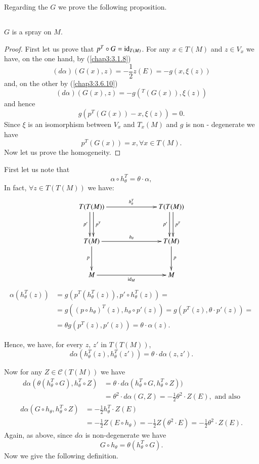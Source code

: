 Regarding the $G$ we prove the following proposition.

\setcounter{subsection}{1}

\subsection{}\label{chap4:4.2.2}

\begin{prop*}
$G$ is a spray on $M$.
\end{prop*}

\begin{proof}
First let us prove that $p^{T}\circ G=\operatorname{id}_{T(M)}$. For any $x\in T(M)$
and $z\in V_{x}$ we have, on the one hand, by (\ref{chap3:3.1.8})
$$
(d\alpha)(G(x),z)=-\frac{1}{2}z(E)=-g(x,\xi(z))
$$\pageoriginale
and, on the other by (\ref{chap3:3.6.10})
$$
(d\alpha)(G(x),z)=-g({}^{T}(G(x)),\xi(z))
$$
and hence
$$
g(p^{T}(G(x))-x,\xi(z))=0.
$$
Since $\xi$ is an isomorphism between $V_{x}$ and $T_{x}(M)$ and $g$
is non - degenerate we have
$$
p^{T}(G(x))=x,\forall x\in T(M).
$$
Now let us prove the homogeneity.
\end{proof}

First let us note that
$$
\alpha\circ h^{T}_{\theta}=\theta\cdot \alpha,
$$
In fact, $\forall z\in T(T(M))$ we have:
\[
\xymatrix@R=1.2cm@C=2.5cm{
T(T(M))\ar[r]^{h^{T}_{\theta}}\ar@<.25em>[d]^{p^{T}}\ar@<-.25em>[d]_{p'}
& T(T(M))\ar@<.25em>[d]^{p^{T}}\ar@<-.25em>[d]_{p'}\\
T(M)\ar[r]^{h_{\theta}}\ar[d]_{p} & T(M)\ar[d]^{p}\\
M\ar[r]_{\id_{M}} & M
}
\]
\begin{align*}
\alpha(h^{T}_{\theta}(z)) &= g(p^{T}(h^{T}_{\theta}(z)),p'\circ
h^{T}_{\theta}(z))=\\
&= g((p\circ h_{\theta})^{T}(z),h_{\theta}\circ
p'(z))=g(p^{T}(z),\theta\cdot p'(z))=\\
&=\theta g(p^{T}(z),p'(z))=\theta\cdot\alpha (z).
\end{align*}\pageoriginale

Hence, we have, for every $z$, $z'$ in $T(T(M))$,
$$
d\alpha(h^{T}_{\theta}(z),h^{T}_{\theta}(z'))=\theta\cdot
d\alpha(z,z').
$$

Now for any $Z\in\mathscr{C}(T(M))$ we have
\begin{align*}
d\alpha(\theta(h^{T}_{\theta}\circ G), h^{T}_{\theta}\circ Z) &=
\theta\cdot d\alpha(h^{T}_{\theta}\circ G,h^{T}_{\theta}\circ Z))\\
&= \theta^{2}\cdot d\alpha(G,Z)=-\frac{1}{2}\theta^{2}\cdot
Z(E),\text{ \ and also}
\end{align*}
\begin{align*}
d\alpha(G\circ h_{\theta},h^{T}_{\theta}\circ Z)
&=-\frac{1}{2}h^{T}_{\theta}\cdot Z(E)\\
&=-\frac{1}{2}Z(E\circ h_{\theta})=-\frac{1}{2}Z(\theta^{2}\cdot
E)=-\frac{1}{2}\theta^{2}\cdot Z(E).
\end{align*}
Again, as above, since $d\alpha$ is non-degenerate we have
$$
G\circ h_{\theta}=\theta(h^{T}_{\theta}\circ G).
$$
Now we give the following definition.

